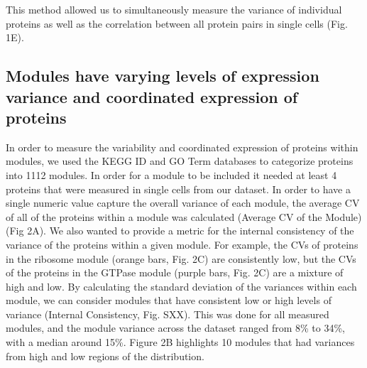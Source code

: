 This method allowed us to simultaneously measure the variance of individual proteins as well as the correlation between all protein pairs in single cells (Fig. 1E).

\subsection{Modules have varying levels of expression variance and coordinated expression of proteins}

In order to measure the variability and coordinated expression of proteins within modules, we used the KEGG ID and GO Term databases to categorize proteins into 1112 modules. In order for a module to be included it needed at least 4 proteins that were measured in single cells from our dataset. In order to have a single numeric value capture the overall variance of each module, the average CV of all of the proteins within a module was calculated (Average CV of the Module) (Fig 2A). We also wanted to provide a metric for the internal consistency of the variance of the proteins within a given module. For example, the CVs of proteins in the ribosome module (orange bars, Fig. 2C) are consistently low, but the CVs of the proteins in the GTPase module (purple bars, Fig. 2C) are a mixture of high and low.  By calculating the standard deviation of the variances within each module, we can consider modules that have consistent low or high levels of variance (Internal Consistency, Fig. SXX). This was done for all measured modules, and the module variance across the dataset ranged from 8\% to 34\%, with a median around 15\%. Figure 2B highlights 10 modules that had variances from high and low regions of the distribution. 

